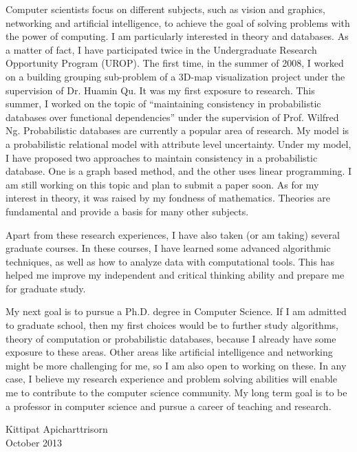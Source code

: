 \documentclass[10pt]{report}
\begin{document}
\vspace{0.2cm}
Computer scientists focus on different subjects, such as vision and graphics, networking and artificial intelligence, to achieve the goal of solving problems with the power of computing. I am particularly interested in theory and databases. As a matter of fact, I have participated twice in the Undergraduate Research Opportunity Program (UROP). The first time, in the summer of 2008, I worked on a building grouping sub-problem of a 3D-map visualization project under the supervision of Dr. Huamin Qu. It was my first exposure to research. This summer, I worked on the topic of “maintaining consistency in probabilistic databases over functional dependencies” under the supervision of Prof. Wilfred Ng. Probabilistic databases are currently a popular area of research. My model is a probabilistic relational model with attribute level uncertainty. Under my model, I have proposed two approaches to maintain consistency in a probabilistic database. One is a graph based method, and the other uses linear programming. I am still working on this topic and plan to submit a paper soon. As for my interest in theory, it was raised by my fondness of mathematics. Theories are fundamental and provide a basis for many other subjects.

\vspace{0.2cm}
Apart from these research experiences, I have also taken (or am taking) several graduate courses. In these courses, I have learned some advanced algorithmic techniques, as well as how to analyze data with computational tools. This has helped me improve my independent and critical thinking ability and prepare me for graduate study.

\vspace{0.2cm}
My next goal is to pursue a Ph.D. degree in Computer Science. If I am admitted to graduate school, then my first choices would be to further study algorithms, theory of computation or probabilistic databases, because I already have some exposure to these areas. Other areas like artificial intelligence and networking might be more challenging for me, so I am also open to working on these. In any case, I believe my research experience and problem solving abilities will enable me to contribute to the computer science community. My long term goal is to be a professor in computer science and pursue a career of teaching and research.

\vspace{1cm}
\raggedleft Kittipat Apicharttrisorn
\\  October 2013
\end{document}
